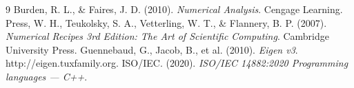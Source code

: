 \documentclass[11pt,a4paper]{article}
\begin{document}
\newpage
\begin{thebibliography}{9}
Burden, R. L., \& Faires, J. D. (2010). \textit{Numerical Analysis}. Cengage Learning.
Press, W. H., Teukolsky, S. A., Vetterling, W. T., \& Flannery, B. P. (2007). \textit{Numerical Recipes 3rd Edition: The Art of Scientific Computing}. Cambridge University Press.
Guennebaud, G., Jacob, B., et al. (2010). \textit{Eigen v3}. http://eigen.tuxfamily.org.
ISO/IEC. (2020). \textit{ISO/IEC 14882:2020 Programming languages --- C++}.
\end{thebibliography}
\end{document}

